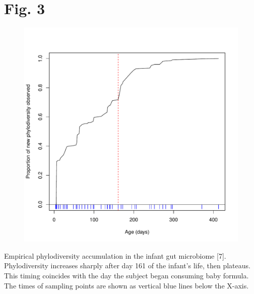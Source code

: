 \documentclass{article}
\begin{document}
\section*{Fig. 3}
\begin{figure}[ht]
	\centering
	\includegraphics[scale=0.80]{../Fig_3.pdf}
\end{figure}
Empirical phylodiversity accumulation in the infant gut microbiome [7]. Phylodiversity increases sharply after day 161 of the infant’s life, then plateaus. This timing coincides with the day the subject began consuming baby formula. The times of sampling points are shown as vertical blue lines below the X-axis.
%
\newpage
%
%
\end{document}
